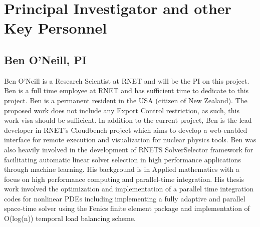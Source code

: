 \section{Principal Investigator and other Key Personnel}

\subsection{Ben O'Neill, PI}
Ben O'Neill is a Research Scientist at RNET and will be the PI on this project. Ben is a full time employee at
RNET and has sufficient time to dedicate to this project. Ben is a permanent resident in the USA (citizen of New Zealand). The proposed work does not include any Export Control restriction, as such, this work visa should be sufficient. In addition to the current project, Ben is the lead developer in RNET's
Cloudbench project which aims to develop a web-enabled interface for remote execution and visualization for nuclear physics tools. Ben was also heavily involved in the development of RNETS SolverSelector framework for facilitating automatic linear solver selection in high performance applications through machine learning. His background is in Applied mathematics with a focus on high performance computing and parallel-time integration. His thesis work involved the optimization and implementation of a parallel time integration codes for nonlinear PDEs including implementing a fully adaptive and parallel space-time solver using the Fenics finite element package and implementation of O(log(n)) temporal load balancing scheme. 

